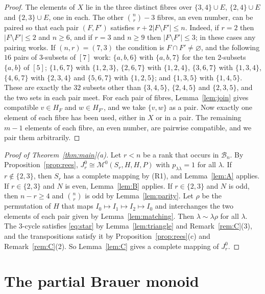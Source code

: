 \documentclass[11pt]{article}
\theoremstyle{remark}
\newcommand{\B}{\mathcal B}
\newcommand{\M}{\mathcal M}
\begin{document}
\begin{proof}
The elements of $X$ lie in the three distinct fibres over $\{3,4\}\cup E$,
$\{2,4\}\cup E$ and $\{2,3\}\cup E$, one in each. The other $\binom nr-3$
fibres, an even number, can be paired so that each pair $(F,F')$ satisfies
$r+2|F\setminus F'|\le n$. Indeed, if $r=2$ then $|F\setminus F'|\le2$ and
$n\ge6$, and if $r=3$ and $n\ge9$ then $|F\setminus F'|\le3$; in these cases
any pairing works. If $(n,r)=(7,3)$ the condition is $F\cap F'\ne\varnothing$,
and the following $16$ pairs of $3$-subsets of $[7]$ work: $\{a,b,6\}$ with
$\{a,b,7\}$ for the ten $2$-subsets $\{a,b\}$ of $[5]$; $\{1,6,7\}$ with
$\{1,2,3\}$, $\{2,6,7\}$ with $\{1,2,4\}$, $\{3,6,7\}$ with $\{1,3,4\}$,
$\{4,6,7\}$ with $\{2,3,4\}$ and $\{5,6,7\}$ with $\{1,2,5\}$; and $\{1,3,5\}$
with $\{1,4,5\}$. These are exactly the $32$ subsets other than $\{3,4,5\}$,
$\{2,4,5\}$ and $\{2,3,5\}$, and the two sets in each pair meet. For each
pair of fibres, Lemma~\ref{lem:join} gives compatible $v\in H_F$ and $w\in
H_{F'}$, and we take $\{v,w\}$ as a pair. Now exactly one element of each fibre
has been used, either in $X$ or in a pair. The remaining $m-1$ elements of each
fibre, an even number, are pairwise compatible, and we pair them arbitrarily.
\end{proof}

\begin{proof}[Proof of Theorem~\ref{thm:main}(a)]
Let $r<n$ be a rank that occurs in $\B_n$. By Proposition~\ref{prop:rees},
$J_r^0\cong\M^0(S_r,H,H,P)$ with $p_{\lambda\lambda}=1$ for all $\lambda$. If
$r\notin\{2,3\}$, then $S_r$ has a complete mapping by (R1), and
Lemma~\ref{lem:A} applies. If $r\in\{2,3\}$ and $N$ is even,
Lemma~\ref{lem:B} applies. If $r\in\{2,3\}$ and $N$ is odd, then $n-r\ge4$ and
$\binom nr$ is odd by Lemma~\ref{lem:parity}. Let $\rho$ be the permutation of
$H$ that maps $I_0\mapsto I_1\mapsto I_2\mapsto I_0$ and interchanges the two
elements of each pair given by Lemma~\ref{lem:matching}. Then
$\lambda\sim\lambda\rho$ for all $\lambda$. The $3$-cycle satisfies
\eqref{eq:star} by Lemma~\ref{lem:triangle} and Remark~\ref{rem:C}(3), and the
transpositions satisfy it by Proposition~\ref{prop:rees}(c) and
Remark~\ref{rem:C}(2). So Lemma~\ref{lem:C} gives a complete mapping of
$J_r^0$.
\end{proof}

\section{The partial Brauer monoid}\label{sec:pb}
\end{document}
